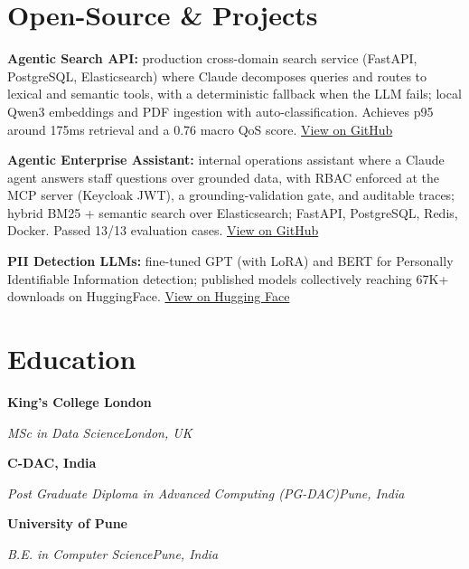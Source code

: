 \documentclass[10pt,a4paper]{article}
\newcommand{\entry}[4]{%
  {\color{company}\bfseries #1}\hfill {\color{muted}#2}\par
  \vspace{1pt}
  {\itshape #3}\hfill {\color{muted}\itshape #4}\par
  \vspace{3pt}%
}
\begin{document}
\section{Open-Source \& Projects}
\begin{tight}
  \item \textbf{Agentic Search API:} production cross-domain search service (FastAPI, PostgreSQL, Elasticsearch) where Claude decomposes queries and routes to lexical and semantic tools, with a deterministic fallback when the LLM fails; local Qwen3 embeddings and PDF ingestion with auto-classification. Achieves p95 around 175ms retrieval and a 0.76 macro QoS score. \href{https://github.com/abhijeetscode/search-agent}{View on GitHub}
  \item \textbf{Agentic Enterprise Assistant:} internal operations assistant where a Claude agent answers staff questions over grounded data, with RBAC enforced at the MCP server (Keycloak JWT), a grounding-validation gate, and auditable traces; hybrid BM25 + semantic search over Elasticsearch; FastAPI, PostgreSQL, Redis, Docker. Passed 13/13 evaluation cases. \href{https://github.com/abhijeetscode/Agentic-Enterprise-Assistant}{View on GitHub}
  \item \textbf{PII Detection LLMs:} fine-tuned GPT (with LoRA) and BERT for Personally Identifiable Information detection; published models collectively reaching 67K+ downloads on HuggingFace. \href{https://huggingface.co/ab-ai/pii_model}{View on Hugging Face}
\end{tight}

\section{Education}
\entry{King's College London}{}{MSc in Data Science}{London, UK}
\vspace{-3pt}
\entry{C-DAC, India}{}{Post Graduate Diploma in Advanced Computing (PG-DAC)}{Pune, India}
\vspace{-3pt}
\entry{University of Pune}{}{B.E. in Computer Science}{Pune, India}
\end{document}
